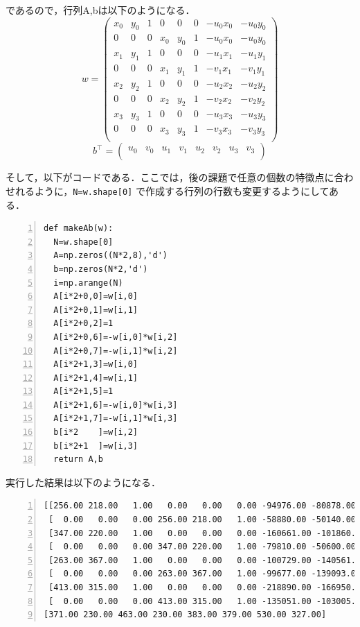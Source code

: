 \documentclass[autodetect-engine,dvi=dvipdfmx,ja=standard,
               a4j,11pt]{bxjsarticle}
\begin{document}
であるので，行列A,bは以下のようになる．
\[
w =
\begin{pmatrix}
x_0 & y_0 & 1 & 0 & 0 & 0 & -u_0 x_0 & -u_0 y_0 \\
0 & 0 & 0 & x_0 & y_0 & 1 & -u_0 x_0 & -u_0 y_0 \\
x_1 & y_1 & 1 & 0 & 0 & 0 & -u_1 x_1 & -u_1 y_1 \\
0 & 0 & 0 & x_1 & y_1 & 1 & -v_1 x_1 & -v_1 y_1 \\
x_2 & y_2 & 1 & 0 & 0 & 0 & -u_2 x_2 & -u_2 y_2 \\
0 & 0 & 0 & x_2 & y_2 & 1 & -v_2 x_2 & -v_2 y_2 \\
x_3 & y_3 & 1 & 0 & 0 & 0 & -u_3 x_3 & -u_3 y_3 \\
0 & 0 & 0 & x_3 & y_3 & 1 & -v_3 x_3 & -v_3 y_3 \\
\end{pmatrix}
\]
\[
b^\top =
\begin{pmatrix}
u_0 & v_0  & u_1 & v_1 & u_2 & v_2 & u_3 & v_3\\
\end{pmatrix}
\]

そして，以下がコードである．ここでは，後の課題で任意の個数の特徴点に合わせれるように，\verb|N=w.shape[0]| で作成する行列の行数も変更するようにしてある．

\begin{Verbatim}[numbers=left, xleftmargin=10mm, numbersep=6pt,
                    fontsize=\small, baselinestretch=0.8]
def makeAb(w):
  N=w.shape[0]
  A=np.zeros((N*2,8),'d')
  b=np.zeros(N*2,'d')
  i=np.arange(N)
  A[i*2+0,0]=w[i,0]
  A[i*2+0,1]=w[i,1]
  A[i*2+0,2]=1
  A[i*2+0,6]=-w[i,0]*w[i,2]
  A[i*2+0,7]=-w[i,1]*w[i,2]
  A[i*2+1,3]=w[i,0]
  A[i*2+1,4]=w[i,1]
  A[i*2+1,5]=1
  A[i*2+1,6]=-w[i,0]*w[i,3]
  A[i*2+1,7]=-w[i,1]*w[i,3]
  b[i*2    ]=w[i,2]
  b[i*2+1  ]=w[i,3]
  return A,b
\end{Verbatim}

実行した結果は以下のようになる．

\begin{Verbatim}[numbers=left, xleftmargin=10mm, numbersep=6pt,
                    fontsize=\small, baselinestretch=0.8]
[[256.00 218.00   1.00   0.00   0.00   0.00 -94976.00 -80878.00]
 [  0.00   0.00   0.00 256.00 218.00   1.00 -58880.00 -50140.00]
 [347.00 220.00   1.00   0.00   0.00   0.00 -160661.00 -101860.00]
 [  0.00   0.00   0.00 347.00 220.00   1.00 -79810.00 -50600.00]
 [263.00 367.00   1.00   0.00   0.00   0.00 -100729.00 -140561.00]
 [  0.00   0.00   0.00 263.00 367.00   1.00 -99677.00 -139093.00]
 [413.00 315.00   1.00   0.00   0.00   0.00 -218890.00 -166950.00]
 [  0.00   0.00   0.00 413.00 315.00   1.00 -135051.00 -103005.00]]
[371.00 230.00 463.00 230.00 383.00 379.00 530.00 327.00]
\end{Verbatim}
\end{document}
